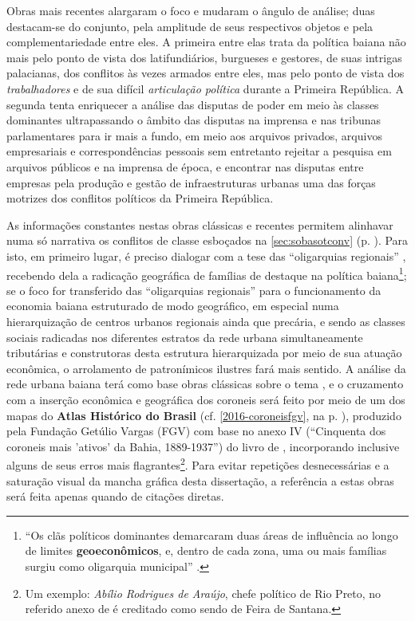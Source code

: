 Obras mais recentes alargaram o foco e mudaram o ângulo de análise; duas destacam-se do conjunto, pela amplitude de seus respectivos objetos e pela complementariedade entre eles. A primeira entre elas \cite{castellucci_maquina_2008} trata da política baiana não mais pelo ponto de vista dos latifundiários, burgueses e gestores, de suas intrigas palacianas, dos conflitos às vezes armados entre eles, mas pelo ponto de vista dos \textit{trabalhadores} e de sua difícil \textit{articulação política} durante a Primeira República. A segunda \cite{CUNHA2011} tenta enriquecer a análise das disputas de poder em meio às classes dominantes ultrapassando o âmbito das disputas na imprensa e nas tribunas parlamentares para ir mais a fundo, em meio aos arquivos privados, arquivos empresariais e correspondências pessoais sem entretanto rejeitar a pesquisa em arquivos públicos e na imprensa de época, e encontrar nas disputas entre empresas pela produção e gestão de infraestruturas urbanas uma das forças motrizes dos conflitos políticos da Primeira República.

As informações constantes nestas obras clássicas e recentes permitem alinhavar numa só narrativa os conflitos de classe esboçados na \autoref{sec:sobasotconv} (p. \pageref{sec:sobasotconv}). Para isto, em primeiro lugar, é preciso dialogar com a tese das ``oligarquias regionais'' \cite{pang_coronelismo_1979,sampaio_partidos_1978,TAVARES2008}, recebendo dela a radicação geográfica de famílias de destaque na política baiana\footnote{``Os clãs políticos dominantes demarcaram duas áreas de influência ao longo de limites \textbf{geoeconômicos}, e, dentro de cada zona, uma ou mais famílias surgiu como oligarquia municipal'' \cite[p.~76, \textbf{grifo nosso}]{pang_coronelismo_1979}.}; se o foco for transferido das ``oligarquias regionais'' para o funcionamento da economia baiana estruturado de modo geográfico, em especial numa hierarquização de centros urbanos regionais ainda que precária, e sendo as classes sociais radicadas nos diferentes estratos da rede urbana simultaneamente tributárias e construtoras desta estrutura hierarquizada por meio de sua atuação econômica, o arrolamento de patronímicos ilustres fará mais sentido. A análise da rede urbana baiana terá como base obras clássicas sobre o tema \cite{geiger_rede_1963,SANTOS1959}, e o cruzamento com a inserção econômica e geográfica dos coroneis será feito por meio de um dos mapas do \textbf{Atlas Histórico do Brasil} (cf. \autoref{2016-coroneisfgv}, na p. \pageref{2016-coroneisfgv}), produzido pela Fundação Getúlio Vargas (FGV) \cite{fgv_coroneis_2016} com base no anexo IV (``Cinquenta dos coroneis mais 'ativos' da Bahia, 1889-1937'') do livro de , incorporando inclusive alguns de seus erros mais flagrantes\footnote{Um exemplo: \textit{Abílio Rodrigues de Araújo}, chefe político de Rio Preto, no referido anexo de  é creditado como sendo de Feira de Santana.}. Para evitar repetições desnecessárias e a saturação visual da mancha gráfica desta dissertação, a referência a estas obras será feita apenas quando de citações diretas.

